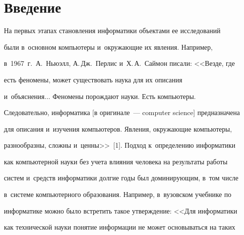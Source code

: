   










 \thispagestyle{headings}

 




\section{Введение}






  На первых этапах становления информатики объектами ее исследований 

были в~основном компьютеры и~окружающие их явления. Например, 

в~1967~г.\ А.~Ньюэлл, А.\,Дж.~Перлис и~Х.\,А.~Саймон писали: <<Везде, где 

есть феномены, может существовать наука для их описания 

и~объяснения$\ldots$ Феномены по\-рож\-да\-ют науки. Есть компьютеры. 

Следовательно, информатика [в оригинале~--- computer science] предназначена 

для описания и~изучения компьютеров. Явления, окру\-жа\-ющие компьютеры, 

разнообразны, слож\-ны и~ценны>>~[1]. Подход к~определению информатики 

как компьютерной науки без учета влияния человека на результаты работы 

сис\-тем и~средств информатики долгие годы был до\-ми\-ни\-ру\-ющим, в~том чис\-ле 

в~сис\-те\-ме компьютерного образования. Например, в~вузовском учебнике по 

информатике мож\-но было встретить такое утверж\-де\-ние: <<Для информатики 

как технической науки понятие информации не может основываться на таких 

